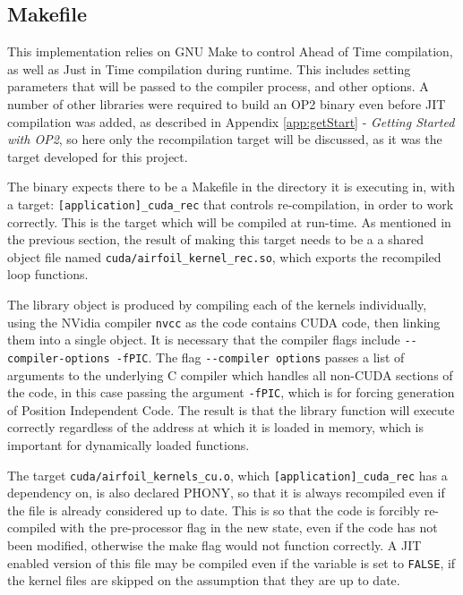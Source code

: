 \subsection{Makefile}
\label{ss:make}
This implementation relies on GNU Make to control Ahead of Time compilation, as well as Just in Time compilation during runtime. This includes setting parameters that will be passed to the compiler process, and other options. A number of other libraries were required to build an OP2 binary even before JIT compilation was added, as described in Appendix \ref{app:getStart} - \textit{Getting Started with OP2}, so here only the recompilation target will be discussed, as it was the target developed for this project.
\par
The binary expects there to be a Makefile in the directory it is executing in, with a target: \verb|[application]_cuda_rec| that controls re-compilation, in order to work correctly. This is the target which will be compiled at run-time. As mentioned in the previous section, the result of making this target needs to be a a shared object file named \verb|cuda/airfoil_kernel_rec.so|, which exports the recompiled loop functions.
\par
The library object is produced by compiling each of the kernels individually, using the NVidia compiler \verb|nvcc| as the code contains CUDA code, then linking them into a single object. It is necessary that the compiler flags include \verb|--compiler-options -fPIC|. The flag \verb|--compiler options| passes a list of arguments to the underlying C compiler which handles all non-CUDA sections of the code, in this case passing the argument \verb|-fPIC|, which is for forcing generation of Position Independent Code. The result is that the library function will execute correctly regardless of the address at which it is loaded in memory, which is important for dynamically loaded functions.
\par
The target \verb|cuda/airfoil_kernels_cu.o|, which \verb|[application]_cuda_rec| has a dependency on, is also declared PHONY, so that it is always recompiled even if the file is already considered up to date. This is so that the code is forcibly re-compiled with the pre-processor flag in the new state, even if the code has not been modified, otherwise the make flag would not function correctly. A JIT enabled version of this file may be compiled even if the variable is set to \verb|FALSE|, if the kernel files are skipped on the assumption that they are up to date.
